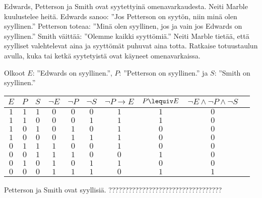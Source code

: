 \begin{tehtavasivu}
\begin{tehtava}
     Edwards, Petterson ja Smith ovat syytettyinä omenavarkaudesta. Neiti Marble kuulustelee heitä. Edwards sanoo: ''Jos Petterson on syytön, niin minä olen syyllinen.'' Petterson toteaa: ''Minä olen syyllinen, jos ja vain jos Edwards on syyllinen.'' Smith väittää: ''Olemme kaikki syyttömiä.'' Neiti Marble tietää, että syylliset valehtelevat aina ja syyttömät puhuvat aina totta. Ratkaise totuustaulun avulla, kuka tai ketkä syytetyistä ovat käyneet omenavarkaissa.
    \begin{vastaus}
    Olkoot $E$: ''Edwards on syyllinen.'', $P$: ''Petterson on syyllinen.'' ja $S$: ''Smith on syyllinen.''
            \begin{center}
		    \begin{tabular}{|c|c|c|c|c|c|c|c|c|c|}\hline
		    $E$ & $P$ & $S$ & $\lnot E$ & $\lnot P$ & $\lnot S$ & $\lnot P\to E$ & $P\lequiv E$ & $\lnot E\land \lnot P \land \lnot S$ \\ \hline
		    $1$ & $1$ & $1$ & $0$ & $0$ & $0$ & $1$ & $1$ & $0$ \\ %
		    $1$ & $1$ & $0$ & $0$ & $0$ & $1$ & $1$ & $1$ & $0$ \\
		    $1$ & $0$ & $1$ & $0$ & $1$ & $0$ & $1$ & $0$ & $0$ \\
		    $1$ & $0$ & $0$ & $0$ & $1$ & $1$ & $1$ & $0$ & $0$ \\
		    $0$ & $1$ & $1$ & $1$ & $0$ & $0$ & $1$ & $0$ & $0$ \\
		    $0$ & $0$ & $1$ & $1$ & $1$ & $0$ & $0$ & $1$ & $0$ \\
		    $0$ & $1$ & $0$ & $1$ & $0$ & $1$ & $1$ & $0$ & $0$ \\
		    $0$ & $0$ & $0$ & $1$ & $1$ & $1$ & $0$ & $1$ & $1$ \\ \hline
\end{tabular}
\end{center}
    Petterson ja Smith ovat syyllisiä. ?????????????????????????????????? %
    \end{vastaus}
    
\end{tehtava}


\end{tehtavasivu}

